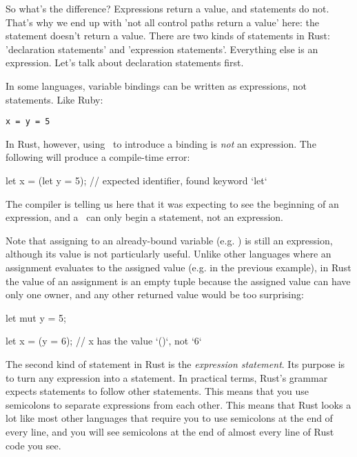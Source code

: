 \blank

So what's the difference? Expressions return a value, and statements do not. That's why we end up with 'not all control paths 
return a value' here: the statement  doesn't return a value. There are two kinds of statements in Rust: 'declaration
statements' and 'expression statements'. Everything else is an expression. Let's talk about declaration statements first.

\blank

In some languages, variable bindings can be written as expressions, not statements. Like Ruby:

\begin{verbatim}
x = y = 5
\end{verbatim}

In Rust, however, using \keylet\ to introduce a binding is \emph{not} an expression. The following will produce a compile-time
error:

\begin{rustc}
let x = (let y = 5); // expected identifier, found keyword `let`
\end{rustc}

The compiler is telling us here that it was expecting to see the beginning of an expression, and a \keylet\ can only begin a
statement, not an expression.

\blank

Note that assigning to an already-bound variable (e.g. ) is still an expression, although its value is not 
particularly useful. Unlike other languages where an assignment evaluates to the assigned value (e.g.  in the previous
example), in Rust the value of an assignment is an empty tuple \code{()} because the assigned value can have only one owner, and 
any other returned value would be too surprising:

\begin{rustc}
let mut y = 5;

let x = (y = 6);  // x has the value `()`, not `6`
\end{rustc}

The second kind of statement in Rust is the \emph{expression statement}. Its purpose is to turn any expression into a statement. 
In practical terms, Rust's grammar expects statements to follow other statements. This means that you use semicolons to separate
expressions from each other. This means that Rust looks a lot like most other languages that require you to use semicolons at the 
end of every line, and you will see semicolons at the end of almost every line of Rust code you see.

